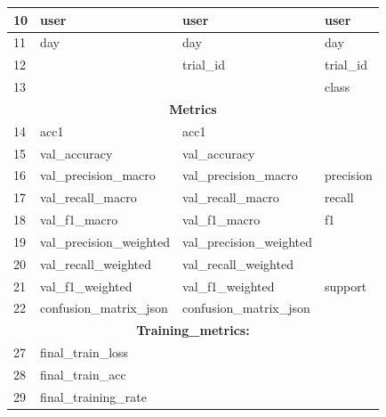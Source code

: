 \begin{table}[H]
\begin{tabular}{|l|l|l|l|}
    10             & user                     & user                     & user                 \\ \hline
    11             & day                      & day                      & day                  \\ \hline
    12             & ~                        & trial\_id                & trial\_id            \\ \hline
    13             & ~                        & ~                        & class                \\ \hline
    \multicolumn{4}{|c|}{\textbf{Metrics}}                                                      \\ \hline
    14             & acc1                     & acc1                     & ~                    \\ \hline
    15             & val\_accuracy            & val\_accuracy            & ~                    \\ \hline
    16             & val\_precision\_macro    & val\_precision\_macro    & precision            \\ \hline
    17             & val\_recall\_macro       & val\_recall\_macro       & recall               \\ \hline
    18             & val\_f1\_macro           & val\_f1\_macro           & f1                   \\ \hline
    19             & val\_precision\_weighted & val\_precision\_weighted & ~                    \\ \hline
    20             & val\_recall\_weighted    & val\_recall\_weighted    & ~                    \\ \hline
    21             & val\_f1\_weighted        & val\_f1\_weighted        & support              \\ \hline
    22             & confusion\_matrix\_json  & confusion\_matrix\_json  & ~                    \\ \hline
    \multicolumn{4}{|c|}{\textbf{Training\_metrics:}}                                           \\ \hline
    27             & final\_train\_loss       & ~                        & ~                    \\ \hline
    28             & final\_train\_acc        & ~                        & ~                    \\ \hline
    29             & final\_training\_rate    & ~                        & ~                    \\ \hline

\end{tabular}
\end{table}
